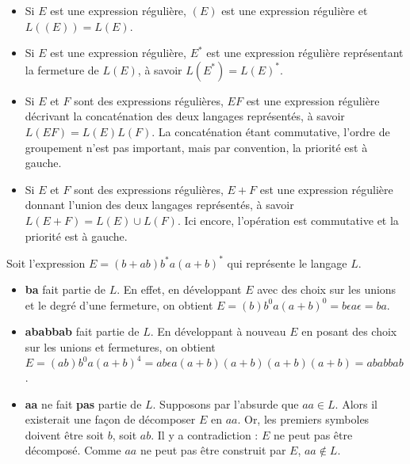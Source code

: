 \begin{itemize}
	\item Si $E$ est une expression régulière, $(E)$ est une expression régulière et $L((E)) = L(E)$.
	\item Si $E$ est une expression régulière, $E^*$ est une expression régulière représentant la fermeture de $L(E)$, à savoir $L(E^*) = L(E)^*$.
	\item Si $E$ et $F$ sont des expressions régulières, $EF$ est une expression régulière décrivant la concaténation des deux langages représentés, à savoir $L(EF)=L(E)L(F)$. La concaténation étant commutative, l'ordre de groupement n'est pas important, mais par convention, la priorité est à gauche.
	\item Si $E$ et $F$ sont des expressions régulières, $E+F$ est une expression régulière donnant l'union des deux langages représentés, à savoir $L(E+F)=L(E)\cup L(F)$. Ici encore, l'opération est commutative et la priorité est à gauche.
\end{itemize}
	
\begin{example}
	Soit l'expression $E = (b+ab)b^*a(a+b)^*$ qui représente le langage $L$.\\
	\begin{itemize}
		\item \textbf{ba} fait partie de $L$. En effet, en développant $E$ avec des choix sur les unions et le degré d'une fermeture, on obtient  $E= (b)b^0a(a+b)^0 = b\epsilon a \epsilon = ba$.
		\item \textbf{ababbab} fait partie de $L$. En développant à nouveau $E$ en posant des choix sur les unions et fermetures, on obtient $E=(ab)b^0a(a+b)^4 = ab\epsilon a (a+b)(a+b)(a+b)(a+b) = ababbab$.
		\item \textbf{aa} ne fait \textbf{pas} partie de $L$. Supposons par l'absurde que $aa \in L$. Alors il existerait une façon de décomposer $E$ en $aa$. Or, les premiers symboles doivent être soit $b$, soit $ab$. Il y a contradiction : $E$ ne peut pas être décomposé. Comme $aa$ ne peut pas être construit par $E$, $aa \notin L$.
	\end{itemize}
	\label{ex:regex}
\end{example}